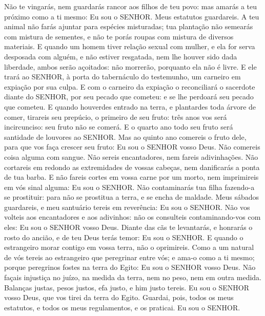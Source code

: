{Não te vingarás, nem guardarás rancor aos filhos de teu povo: mas amarás a teu próximo como a ti mesmo: Eu sou o SENHOR.
Meus estatutos guardareis. A teu animal não farás ajuntar para espécies misturadas; tua plantação não semearás com mistura de sementes, e não te porás roupas com mistura de diversos materiais.
E quando um homem tiver relação sexual com mulher, e ela for serva desposada com alguém, e não estiver resgatada, nem lhe houver sido dada liberdade, ambos serão açoitados: não morrerão, porquanto ela não é livre.
E ele trará ao SENHOR, à porta do tabernáculo do testemunho, um carneiro em expiação por sua culpa.
E com o carneiro da expiação o reconciliará o sacerdote diante do SENHOR, por seu pecado que cometeu: e se lhe perdoará seu pecado que cometeu.
E quando houverdes entrado na terra, e plantardes toda árvore de comer, tirareis seu prepúcio, o primeiro de seu fruto: três anos vos será incircunciso: seu fruto não se comerá.
E o quarto ano todo seu fruto será santidade de louvores ao SENHOR.
Mas ao quinto ano comereis o fruto dele, para que vos faça crescer seu fruto: Eu sou o SENHOR vosso Deus.
Não comereis coisa alguma com sangue. Não sereis encantadores, nem fareis adivinhações.
Não cortareis em redondo as extremidades de vossas cabeças, nem danificarás a ponta de tua barba.
E não fareis cortes em vossa carne por um morto, nem imprimireis em vós sinal alguma: Eu sou o SENHOR.
Não contaminarás tua filha fazendo-a se prostituir: para não se prostitua a terra, e se encha de maldade.
Meus sábados guardareis, e meu santuário tereis em reverência: Eu sou o SENHOR.
Não vos volteis aos encantadores e aos adivinhos: não os consulteis contaminando-vos com eles: Eu sou o SENHOR vosso Deus.
Diante das cãs te levantarás, e honrarás o rosto do ancião, e de teu Deus terás temor: Eu sou o SENHOR.
E quando o estrangeiro morar contigo em vossa terra, não o oprimireis.
Como a um natural de vós tereis ao estrangeiro que peregrinar entre vós; e ama-o como a ti mesmo; porque peregrinos fostes na terra do Egito: Eu sou o SENHOR vosso Deus.
Não façais injustiça no juízo, na medida da terra, nem no peso, nem em outra medida.
Balanças justas, pesos justos, efa justo, e him justo tereis. Eu sou o SENHOR vosso Deus, que vos tirei da terra do Egito.
Guardai, pois, todos os meus estatutos, e todos os meus regulamentos, e os praticai. Eu sou o SENHOR.

}
